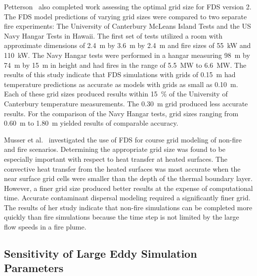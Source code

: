\documentclass[11pt]{book}
\begin{document}
Petterson~\cite{Petterson:1} also completed work assessing the optimal grid size for FDS version 2. The FDS model predictions of varying grid sizes
were  compared to two separate fire  experiments: The University of Canterbury  McLeans Island  Tests and the  US Navy Hangar  Tests in Hawaii.  The
first  set  of  tests utilized  a  room with  approximate dimensions of  2.4~m by  3.6~m by  2.4~m and fire  sizes of  55~kW and 110~kW. The  Navy
Hangar  tests were performed  in a  hangar measuring 98~m by 74~m by 15~m in height and had fires in the range of 5.5~MW to 6.6~MW. The results  of
this study indicate that  FDS simulations with grids of 0.15~m had temperature predictions as accurate as models with grids as  small as 0.10~m. Each
of these grid  sizes produced results within   15~\%   of   the   University   of   Canterbury   temperature measurements. The 0.30~m grid  produced
less accurate results. For the comparison of the Navy Hangar tests, grid sizes ranging from 0.60~m to 1.80~m yielded results of comparable accuracy.

Musser et  al.~\cite{Musser:1} investigated  the use of  FDS for course grid  modeling of non-fire and fire  scenarios. Determining the
appropriate  grid  size was  found  to  be  especially important  with respect  to heat  transfer  at heated  surfaces.  The convective  heat
transfer  from the  heated surfaces  was most  accurate when  the near surface grid cells were smaller than the depth of the thermal boundary layer.
However, a  finer grid  size  produced better  results at  the expense of computational time. Accurate contaminant dispersal modeling required a
significantly finer grid. The results of her study indicate that  non-fire simulations  can be  completed more  quickly  than fire simulations
because  the time  step is not  limited by the  large flow speeds in a fire plume.


\subsection{Sensitivity of Large Eddy Simulation Parameters}
\end{document}
